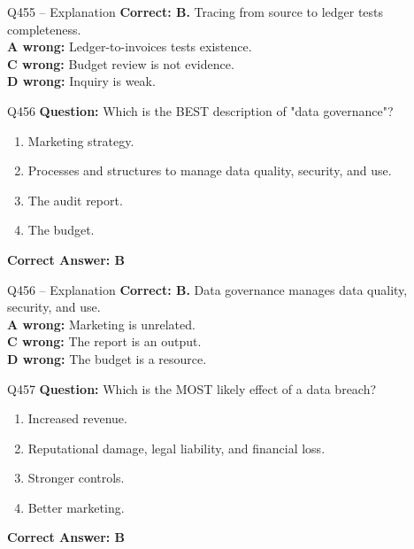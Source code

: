 \documentclass[aspectratio=169,10pt]{beamer}
\begin{document}
	\begin{frame}[t]{Q455 -- Explanation}
		\small
		\textbf{Correct: B.} Tracing from source to ledger tests completeness. \\[4pt]
		\textbf{A wrong:} Ledger-to-invoices tests existence. \\[2pt]
		\textbf{C wrong:} Budget review is not evidence. \\[2pt]
		\textbf{D wrong:} Inquiry is weak.
	\end{frame}
	
	\begin{frame}[t]{Q456}
		\small
		\textbf{Question:} Which is the BEST description of "data governance"?
		\begin{enumerate}[label=\Alph*.,itemsep=1pt,topsep=2pt]
			\item Marketing strategy.
			\item Processes and structures to manage data quality, security, and use.
			\item The audit report.
			\item The budget.
		\end{enumerate}
		\vspace{4pt}
		\textbf{Correct Answer: B}
	\end{frame}
	
	\begin{frame}[t]{Q456 -- Explanation}
		\small
		\textbf{Correct: B.} Data governance manages data quality, security, and use. \\[4pt]
		\textbf{A wrong:} Marketing is unrelated. \\[2pt]
		\textbf{C wrong:} The report is an output. \\[2pt]
		\textbf{D wrong:} The budget is a resource.
	\end{frame}
	
	\begin{frame}[t]{Q457}
		\small
		\textbf{Question:} Which is the MOST likely effect of a data breach?
		\begin{enumerate}[label=\Alph*.,itemsep=1pt,topsep=2pt]
			\item Increased revenue.
			\item Reputational damage, legal liability, and financial loss.
			\item Stronger controls.
			\item Better marketing.
		\end{enumerate}
		\vspace{4pt}
		\textbf{Correct Answer: B}
	\end{frame}
	
\end{document}
